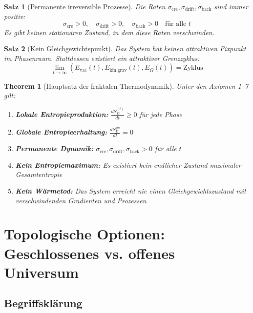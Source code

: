 \documentclass[12pt,a4paper]{article}
\newtheorem{satz}{Satz}
\newtheorem{theorem}{Theorem}
\begin{document}
\begin{satz}[Permanente irreversible Prozesse]
Die Raten $\sigma_{\text{cre}}, \sigma_{\text{drift}}, \sigma_{\text{back}}$ sind immer positiv:
\begin{equation}
\sigma_{\text{cre}} > 0,\quad \sigma_{\text{drift}} > 0,\quad \sigma_{\text{back}} > 0 \quad \text{für alle } t
\end{equation}
Es gibt keinen stationären Zustand, in dem diese Raten verschwinden.
\end{satz}

\begin{satz}[Kein Gleichgewichtspunkt]
Das System hat keinen attraktiven Fixpunkt im Phasenraum. Stattdessen existiert ein attraktiver Grenzzyklus:
\begin{equation}
\lim_{t \to \infty} (E_{\text{vac}}(t), E_{\text{kin,grav}}(t), E_{\Omega}(t)) = \text{Zyklus}
\end{equation}
\end{satz}

\begin{theorem}[Hauptsatz der fraktalen Thermodynamik]
Unter den Axiomen 1--7 gilt:
\begin{enumerate}
    \item \textbf{Lokale Entropieproduktion:} $\displaystyle \frac{dS_D^{(i)}}{dt} \geq 0$ für jede Phase
    \item \textbf{Globale Entropieerhaltung:} $\displaystyle \frac{dS_D^{\text{ges}}}{dt} = 0$
    \item \textbf{Permanente Dynamik:} $\sigma_{\text{cre}}, \sigma_{\text{drift}}, \sigma_{\text{back}} > 0$ für alle $t$
    \item \textbf{Kein Entropiemaximum:} Es existiert kein endlicher Zustand maximaler Gesamtentropie
    \item \textbf{Kein Wärmetod:} Das System erreicht nie einen Gleichgewichtszustand mit verschwindenden Gradienten und Prozessen
\end{enumerate}
\end{theorem}

\section{Topologische Optionen: Geschlossenes vs. offenes Universum}

\subsection{Begriffsklärung}
\end{document}
